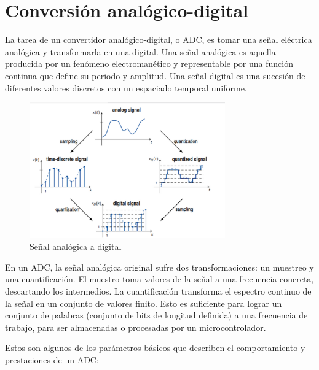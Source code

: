 \documentclass[12pt]{report} %
\begin{document}
	\section{Conversión analógico-digital}
	
	La tarea de un convertidor analógico-digital, o ADC, es tomar una señal eléctrica analógica y transformarla en una digital. Una señal analógica es aquella producida por un fenómeno electromanético y representable por una función continua que define su periodo y amplitud. Una señal digital es una sucesión de diferentes valores discretos con un espaciado temporal uniforme.
	
	\begin{figure}[H]
		\includegraphics[width=0.75\textwidth]{analog-vs-digital-signal.jpg}
		\caption[Señal analógica a digital]{Señal analógica a digital\protect\footnotemark}
		\label{fig:analog-vs-digital-signal.jpg}
	\end{figure}
	
	En un ADC, la señal analógica original sufre dos transformaciones: un muestreo y una cuantificación. El muestro toma valores de la señal a una frecuencia concreta, descartando los intermedios. La cuantificación transforma el espectro continuo de la señal en un conjunto de valores finito. Esto es suficiente para lograr un conjunto de palabras (conjunto de bits de longitud definida) a una frecuencia de trabajo, para ser almacenadas o procesadas por un microcontrolador.
	
	Estos son algunos de los parámetros básicos que describen el comportamiento y prestaciones de un ADC:
	
\end{document}
